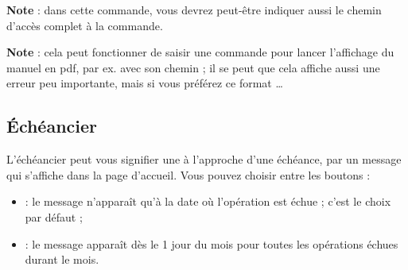 \textbf{Note} : dans cette commande, vous devrez peut-être indiquer aussi le chemin d'accès complet à la commande.

\ifIllustration
\fi

\textbf{Note} : cela peut fonctionner de saisir une commande pour lancer l'affichage du manuel en pdf, par ex.  avec son chemin ; il se peut que cela affiche aussi une erreur peu importante, mais si vous préférez ce format \dots




\subsection{Échéancier\label{setup-general-planned}}

L'échéancier peut vous signifier une  à l'approche d'une échéance, par un message qui s'affiche dans la page d'accueil. Vous pouvez choisir entre les boutons :

\begin{itemize}
	\ifIllustration
	\label{setup-plannedtransactions-img}
	\fi
	\item {} : le message n'apparaît qu'à la date où l'opération est échue ; c'est le choix par défaut ;
	\item {} : le message apparaît dès le 1 jour du mois pour toutes les opérations échues durant le mois.
\end{itemize}

